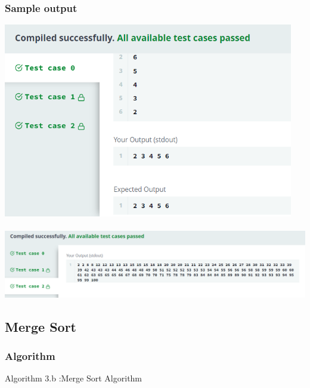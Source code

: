 \documentclass[14pt, letterpaper]{article}
\begin{document}
\subsubsection{Sample output}
\includegraphics[width=5in]{images/mergeSort1.png}\\ \\
\includegraphics[width=7in]{images/mergeSort2.png}
\newpage
\subsection{Merge Sort}
\subsubsection{Algorithm}
\hline 
\vspace{0.1cm}
\hspace{0.5cm}Algorithm 3.b :Merge Sort Algorithm
\vspace{0.1cm}
\hline
\end{document}
